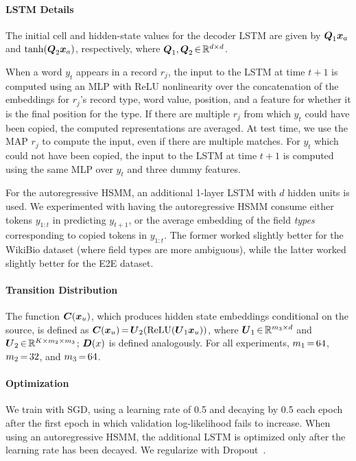 \documentclass[11pt,a4paper]{article}
\begin{document}
\paragraph{LSTM Details}
The initial cell and hidden-state values for the decoder LSTM are given by $\boldsymbol{Q}_1 \boldsymbol{x}_a$ and $\tanh(\boldsymbol{Q}_2 \boldsymbol{x}_a)$, respectively, where $\boldsymbol{Q}_1, \boldsymbol{Q}_2 \, {\in} \, \mathbb{R}^{d \times d}$. 

When a word $y_t$ appears in a record $r_j$, the input to the LSTM at time $t+1$ is computed using an MLP with ReLU nonlinearity over the concatenation of the embeddings for $r_j$'s record type, word value, position, and a feature for whether it is the final position for the type. If there are multiple $r_j$ from which $y_t$ could have been copied, the computed representations are averaged. At test time, we use the MAP $r_j$ to compute the input, even if there are multiple matches. For $y_t$ which could not have been copied, the input to the LSTM at time $t+1$ is computed using the same MLP over $y_t$ and three dummy features.

For the autoregressive HSMM, an additional 1-layer LSTM with $d$ hidden units is used. We experimented with having the autoregressive HSMM consume either tokens $y_{1:t}$ in predicting $y_{t+1}$, or the average embedding of the field \textit{types} corresponding to copied tokens in $y_{1:t}$. The former worked slightly better for the WikiBio dataset (where field types are more ambiguous), while the latter worked slightly better for the E2E dataset.

\paragraph{Transition Distribution}
The function $\boldsymbol{C}(\boldsymbol{x}_u)$, which produces hidden state embeddings conditional on the source, is defined as $\boldsymbol{C}(\boldsymbol{x}_u) \, {=} \, \boldsymbol{U}_2 (\mathrm{ReLU} (\boldsymbol{U}_1 \boldsymbol{x}_u))$, where $\boldsymbol{U}_1 \, {\in} \, \mathbb{R}^{m_3 \times d}$ and $\boldsymbol{U}_2 \, {\in} \, \mathbb{R}^{K \times m_2 \times m_3}$; $\boldsymbol{D}(x)$ is defined analogously. For all experiments, $m_1 \, {=} \, 64$, $m_2 \, {=} \, 32$, and $m_3 \, {=} \, 64$.

\paragraph{Optimization}
We train with SGD, using a learning rate of 0.5 and decaying by 0.5 each epoch after the first epoch in which validation log-likelihood fails to increase. When using an autoregressive HSMM, the additional LSTM is optimized only after the learning rate has been decayed. We regularize with Dropout~\citep{srivastava2014dropout}.
\end{document}
